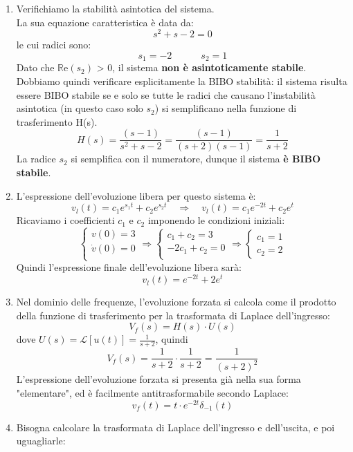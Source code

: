 \documentclass[12pt,a4paper]{article}
\begin{document}
	\begin{enumerate}
		\item Verifichiamo la stabilità asintotica del sistema.\\La sua equazione caratteristica è data da:
		\[
			s^2+s-2 = 0
		\]
		le cui radici sono:
		\[
			s_1 = -2\quad\quad\quad s_2 = 1
		\]
		Dato che $\mathbb{R}$e$(s_2)$ > 0, il sistema \textbf{non è asintoticamente stabile}.\\
		Dobbiamo quindi verificare esplicitamente la BIBO stabilità: il sistema risulta essere BIBO stabile se e solo se tutte le radici che causano l'instabilità asintotica (in questo caso solo $s_2$) si semplificano nella funzione di trasferimento H(s).
		\[
			H(s) = \frac{(s-1)}{s^2+s-2} = \frac{(s-1)}{(s+2)(s-1)} = \frac{1}{s+2}
		\]
		La radice $s_2$ si semplifica con il numeratore, dunque il sistema \textbf{è BIBO stabile}.
		\item L'espressione dell'evoluzione libera per questo sistema è:
		\[
			v_l(t) = c_1e^{s_1t} + c_2e^{s_2t}\quad\Rightarrow\quad v_l(t) = c_1e^{-2t} + c_2e^t
		\]
		Ricaviamo i coefficienti $c_1$ e $c_2$ imponendo le condizioni iniziali:
		\[
			\begin{cases}
				v(0) = 3\\
				\dot{v}(0) = 0\\
			\end{cases}
			\Rightarrow
			\begin{cases}
				c_1+c_2 = 3\\
				-2c_1+c_2 = 0\\
			\end{cases}
			\Rightarrow
			\begin{cases}
				c_1 = 1\\
				c_2 = 2
			\end{cases}
		\]
		Quindi l'espressione finale dell'evoluzione libera sarà:
		\[
			v_l(t) = e^{-2t} + 2e^t
		\]
		\item Nel dominio delle frequenze, l'evoluzione forzata si calcola come il prodotto della funzione di trasferimento per la trasformata di Laplace dell'ingresso:
		\[
			V_f(s) = H(s)\cdot U(s)
		\]
		dove $U(s) = \mathcal{L}[u(t)] = \frac{1}{s+2}$, quindi
		\[
			V_f(s) = \frac{1}{s+2}\cdot \frac{1}{s+2} = \frac{1}{(s+2)^2}
		\]
		L'espressione dell'evoluzione forzata si presenta già nella sua forma "elementare", ed è facilmente antitrasformabile secondo Laplace:
		\[
			v_f(t) = t\cdot e^{-2t}\delta_{-1}(t)
		\]
		\item Bisogna calcolare la trasformata di Laplace dell'ingresso e dell'uscita, e poi uguagliarle:

\end{enumerate}
\end{document}
